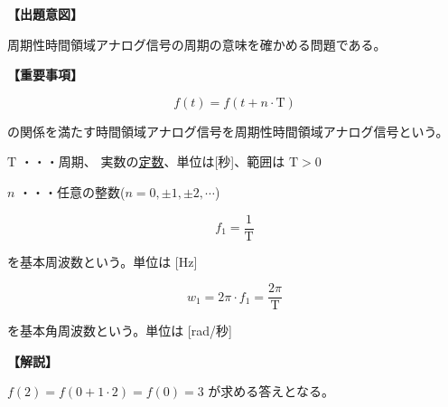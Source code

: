 \noindent \textbf{【出題意図】}

\noindent 周期性時間領域アナログ信号の周期の意味を確かめる問題である。

\vspace{1em}
\noindent \textbf{【重要事項】}

\[
f(t) = f(t + n \cdot \textrm{T})
\]

\noindent の関係を満たす時間領域アナログ信号を周期性時間領域アナログ信号という。

\medskip
\noindent $\textrm{T}$ ・・・周期、 実数の\underline{定数}、単位は[秒]、範囲は $\textrm{T} > 0$

\medskip
\noindent $n$ ・・・任意の整数($n = 0,\pm1,\pm2,\cdots$)

\[
f_1 = \frac{1}{\textrm{T}}
\]

\noindent を基本周波数という。単位は [Hz]

\[
w_1 = 2\pi \cdot f_1 = \frac{2\pi}{\textrm{T}}
\]

\noindent を基本角周波数という。単位は [rad/秒] 


\vspace{1em}
\noindent \textbf{【解説】}

\noindent $f(2) = f(0 + 1 \cdot 2) = f(0) = 3$ が求める答えとなる。
